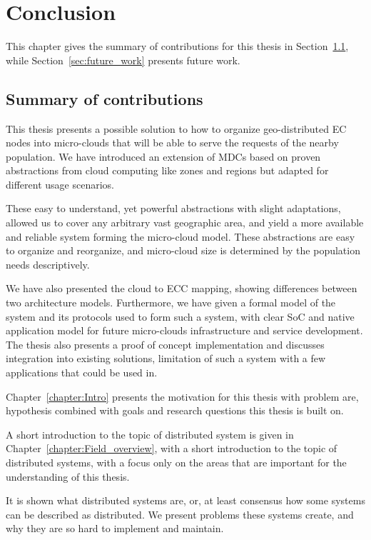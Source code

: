 \chapter{Conclusion}\label{chapter:Conclusion}
%
This chapter gives the summary of contributions for this thesis in Section~\ref{sec:summary_of_contributions}, while Section~\ref{sec:future_work} presents future work.
%
%
\section{Summary of contributions}\label{sec:summary_of_contributions}
%
This thesis presents a possible solution to how to organize geo-distributed EC nodes into micro-clouds that will be able to serve the requests of the nearby population. We have introduced an extension of MDCs based on proven abstractions from cloud computing like zones and regions but adapted for different usage scenarios.

These easy to understand, yet powerful abstractions with slight adaptations, allowed us to cover any arbitrary vast geographic area, and yield a more available and reliable system forming the micro-cloud model. These abstractions are easy to organize and reorganize, and micro-cloud size is determined by the population needs descriptively. 

We have also presented the cloud to ECC mapping, showing differences between two architecture models. Furthermore, we have given a formal model of the system and its protocols used to form such a system, with clear SoC and native application model for future micro-clouds infrastructure and service development. The thesis also presents a proof of concept implementation and discusses integration into existing solutions, limitation of such a system with a few applications that could be used in.

Chapter~\ref{chapter:Intro} presents the motivation for this thesis with problem are, hypothesis combined with goals and research questions this thesis is built on.

A short introduction to the topic of distributed system is given in Chapter~\ref{chapter:Field_overview}, with a short introduction to the topic of distributed systems, with a focus only on the areas that are important for the understanding of this thesis. 

It is shown what distributed systems are, or, at least consensus how some systems can be described as distributed. We present problems these systems create, and why they are so hard to implement and maintain. 

